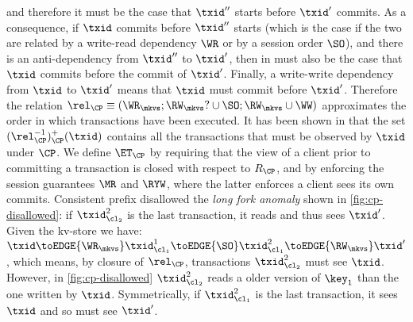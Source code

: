 and therefore it {must} be the case that $\txid''$ starts before 
$\txid'$ commits. 
As a consequence, if $\txid$ commits before $\txid''$ starts (which is the case if the two are 
related by a write-read dependency \(\WR\) or by a session order \(\SO\)), and there is an anti-dependency 
from $\txid''$ to $\txid'$, then in {must} also be the case that $\txid$ commits before 
the commit of $\txid'$.
Finally, a write-write dependency from $\txid$ to $\txid'$ means that $\txid$ {must} commit before $\txid'$. 
Therefore the relation $\rel_{\CP} \equiv (\WR_{\mkvs}; \RW_{\mkvs}? \cup \SO;  \RW_{\mkvs} \cup \WW)$ 
approximates the order in which transactions have been executed. It has been shown in \cite{laws} 
that the set $(\rel_{\CP}^{-1})^{+}_{\CP}(\txid)$ contains all the transactions that {must} be observed by $\txid$ under 
$\CP$. We define $\ET_{\CP}$ by requiring that the view of a client prior to committing a transaction is 
closed with respect to $R_{\CP}$, and by enforcing the session guarantees $\MR$ and $\RYW$,
where the latter enforces a client sees its own commits.
Consistent prefix disallowed the \emph{long fork anomaly} shown in \cref{fig:cp-disallowed}:
if \( \txid_{\cl_2}^2\) is the last transaction, it reads and thus sees \( \txid' \).
Given the kv-store we have:
\(
\txid \toEDGE{\WR_\mkvs} \txid^1_{\cl_1} \toEDGE{\SO} \txid^2_{\cl_1} \toEDGE{\RW_\mkvs} \txid'
\),
which means, by closure of \( \rel_{\CP} \), transactions \( \txid_{\cl_2}^2 \) must see \( \txid \).
However, in \cref{fig:cp-disallowed} \( \txid_{\cl_2}^2 \) reads a older version of \( \key_1 \) than the one written by \( \txid \).
Symmetrically,
if \( \txid_{\cl_1}^2\) is the last transaction, it sees \( \txid \) and so must see \( \txid' \).


